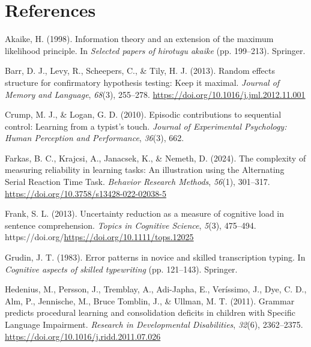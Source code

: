 \documentclass[
  10pt,
  letterpaper]{article}
\newlength{\cslhangindent}
\newenvironment{CSLReferences}[2] %
 {\begin{list}{}{%
  \setlength{\itemindent}{0pt}
  \setlength{\leftmargin}{0pt}
  \setlength{\parsep}{0pt}
  \ifodd #1
   \setlength{\leftmargin}{\cslhangindent}
   \setlength{\itemindent}{-1\cslhangindent}
  \fi
  \setlength{\itemsep}{#2\baselineskip}}}
 {\end{list}}
\begin{document}
\section{References}\label{references}

\label{refs}
\begin{CSLReferences}{1}{0}
Akaike, H. (1998). Information theory and an extension of the maximum
likelihood principle. In \emph{Selected papers of hirotugu akaike} (pp.
199--213). Springer.

Barr, D. J., Levy, R., Scheepers, C., \& Tily, H. J. (2013). Random
effects structure for confirmatory hypothesis testing: {Keep} it
maximal. \emph{Journal of Memory and Language}, \emph{68}(3), 255--278.
\url{https://doi.org/10.1016/j.jml.2012.11.001}

Crump, M. J., \& Logan, G. D. (2010). Episodic contributions to
sequential control: Learning from a typist's touch. \emph{Journal of
Experimental Psychology: Human Perception and Performance},
\emph{36}(3), 662.

Farkas, B. C., Krajcsi, A., Janacsek, K., \& Nemeth, D. (2024). The
complexity of measuring reliability in learning tasks: {An} illustration
using the {Alternating} {Serial} {Reaction} {Time} {Task}.
\emph{Behavior Research Methods}, \emph{56}(1), 301--317.
\url{https://doi.org/10.3758/s13428-022-02038-5}

Frank, S. L. (2013). Uncertainty reduction as a measure of cognitive
load in sentence comprehension. \emph{Topics in Cognitive Science},
\emph{5}(3), 475--494.
https://doi.org/\url{https://doi.org/10.1111/tops.12025}

Grudin, J. T. (1983). Error patterns in novice and skilled transcription
typing. In \emph{Cognitive aspects of skilled typewriting} (pp.
121--143). Springer.

Hedenius, M., Persson, J., Tremblay, A., Adi-Japha, E., Veríssimo, J.,
Dye, C. D., Alm, P., Jennische, M., Bruce Tomblin, J., \& Ullman, M. T.
(2011). Grammar predicts procedural learning and consolidation deficits
in children with {Specific} {Language} {Impairment}. \emph{Research in
Developmental Disabilities}, \emph{32}(6), 2362--2375.
\url{https://doi.org/10.1016/j.ridd.2011.07.026}


\end{CSLReferences}
\end{document}
